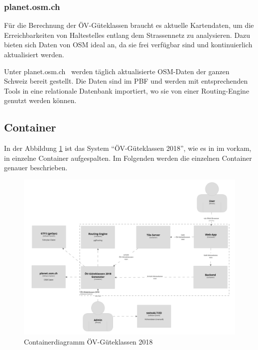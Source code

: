 \subsubsection{planet.osm.ch}
\label{subsystem:planet.osm.ch}

Für die Berechnung der ÖV-Güteklassen braucht es aktuelle Kartendaten, um die Erreichbarkeiten von \glspl{Haltestelle} entlang dem Strassennetz zu analysieren.
Dazu bieten sich Daten von \acl{OSM} ideal an, da sie frei verfügbar sind und kontinuierlich aktualisiert werden.

Unter planet.osm.ch~\cite{planet_osm_ch} werden täglich aktualisierte \ac{OSM}-Daten der ganzen Schweiz bereit gestellt.
Die Daten sind im \ac{PBF} und werden mit entsprechenden Tools in eine relationale Datenbank importiert, wo sie von einer \gls{Routing-Engine} genutzt werden können.


\subsection{Container}
\label{Architektur:Container}

In der Abbildung \ref{fig:container-diagram} ist das System "`ÖV-Güteklassen 2018"', wie es in im  vorkam, in einzelne Container aufgespalten.
Im Folgenden werden die einzelnen Container genauer beschrieben.

\begin{figure}[ht]
    \centering
    \includegraphics[width=1.0\linewidth]{projectdoc/img/container-diagram.png}
    \caption[Containerdiagramm]{Containerdiagramm ÖV-Güteklassen 2018}
    \label{fig:container-diagram}
\end{figure}


